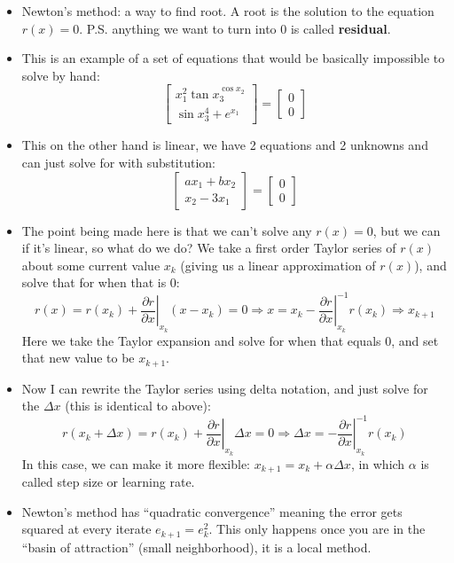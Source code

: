 \begin{itemize}
    \item Newton's method: a way to find root. A root is the solution to the equation $r(x) = 0$. P.S. anything we want to turn into $0$ is called \textbf{residual}.
    \item This is an example of a set of equations that would be basically impossible to solve by hand:
    \begin{equation}
        \begin{bmatrix}
        x_{1}^{2}\tan x_{3}^{\cos x_{2}}\\
        \sin x_{3}^{4} +e^{x_{1}}
        \end{bmatrix} =\begin{bmatrix}
        0\\
        0
        \end{bmatrix}
    \end{equation}
    \item This on the other hand is linear, we have 2 equations and 2 unknowns and can just solve for with substitution:
    \begin{equation}
        \begin{bmatrix}
        ax_1+bx_2\\
        x_2-3x_1
        \end{bmatrix} =\begin{bmatrix}
        0\\
        0
        \end{bmatrix}
    \end{equation}
    \item The point being made here is that we can't solve any $r(x) = 0$, but we can if it's linear, so what do we do? We take a first order Taylor series of $r(x)$ about some current value $x_k$ (giving us a linear approximation of $r(x)$), and solve that for when that is $0$:
    \begin{equation}
        r( x) =r( x_{k}) +\left. \frac{\partial r}{\partial x}\right| _{x_{k}}( x-x_{k}) =0\Rightarrow x=x_{k} -\left. \frac{\partial r}{\partial x}\right| _{x_{k}}^{-1} r( x_{k}) \Rightarrow x_{k+1}
    \end{equation}
    Here we take the Taylor expansion and solve for when that equals 0, and set that new value to be $x_{k+1}$.
    \item Now I can rewrite the Taylor series using delta notation, and just solve for the $\Delta x$ (this is identical to above):
    \begin{equation}
        r( x_{k} +\Delta x) =r( x_{k}) +\left. \frac{\partial r}{\partial x}\right| _{x_{k}} \Delta x=0\Rightarrow \Delta x=-\left. \frac{\partial r}{\partial x}\right| _{x_{k}}^{-1} r( x_{k})
    \end{equation}
    In this case, we can make it more flexible: $x_{k+1} = x_k + \alpha \Delta x$, in which $\alpha$ is called step size or learning rate.
    \item Newton's method has ``quadratic convergence'' meaning the error gets squared at every iterate $e_{k+1} = e_k^2$. This only happens once you are in the ``basin of attraction'' (small neighborhood), it is a local method.
\end{itemize}
